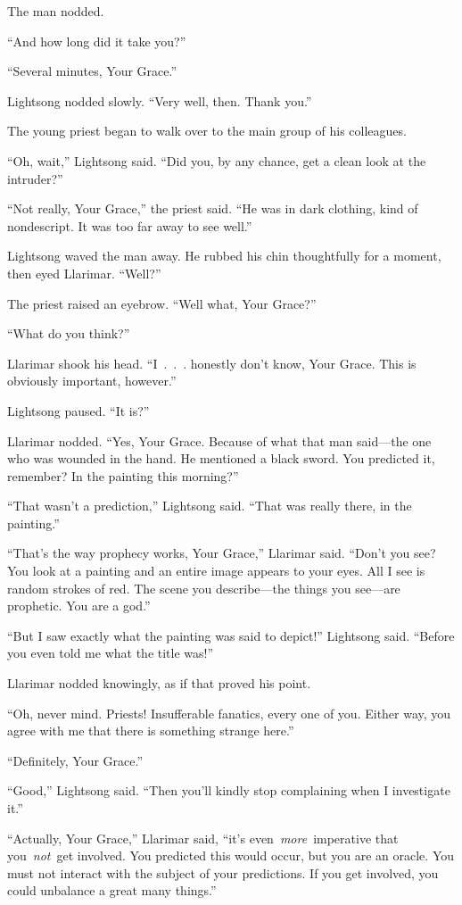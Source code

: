 The man nodded.

“And how long did it take you?”

“Several minutes, Your Grace.”

Lightsong nodded slowly. “Very well, then. Thank you.”

The young priest began to walk over to the main group of his colleagues.

“Oh, wait,” Lightsong said. “Did you, by any chance, get a clean look at the intruder?”

“Not really, Your Grace,” the priest said. “He was in dark clothing, kind of nondescript. It was too far away to see well.”

Lightsong waved the man away. He rubbed his chin thoughtfully for a moment, then eyed Llarimar. “Well?”

The priest raised an eyebrow. “Well what, Your Grace?”

“What do you think?”

Llarimar shook his head. “I~.~.~. honestly don’t know, Your Grace. This is obviously important, however.”

Lightsong paused. “It is?”

Llarimar nodded. “Yes, Your Grace. Because of what that man said—the one who was wounded in the hand. He mentioned a black sword. You predicted it, remember? In the painting this morning?”

“That wasn’t a prediction,” Lightsong said. “That was really there, in the painting.”

“That’s the way prophecy works, Your Grace,” Llarimar said. “Don’t you see? You look at a painting and an entire image appears to your eyes. All I see is random strokes of red. The scene you describe—the things you see—are prophetic. You are a god.”

“But I saw exactly what the painting was said to depict!” Lightsong said. “Before you even told me what the title was!”

Llarimar nodded knowingly, as if that proved his point.

“Oh, never mind. Priests! Insufferable fanatics, every one of you. Either way, you agree with me that there is something strange here.”

“Definitely, Your Grace.”

“Good,” Lightsong said. “Then you’ll kindly stop complaining when I investigate it.”

“Actually, Your Grace,” Llarimar said, “it’s even~\textit{more}~imperative that you~\textit{not}~get involved. You predicted this would occur, but you are an oracle. You must not interact with the subject of your predictions. If you get involved, you could unbalance a great many things.”


